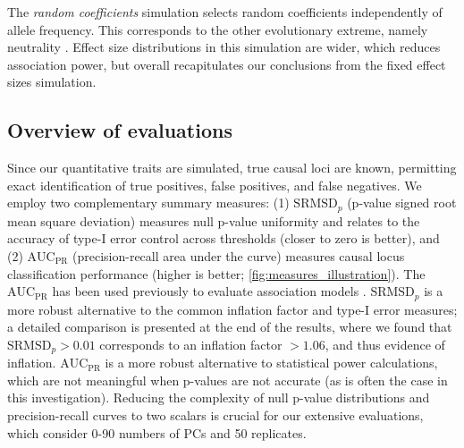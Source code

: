 \documentclass[11pt]{article}
\newcommand{\rmsd}{\text{SRMSD}_p}
\newcommand{\auc}{\text{AUC}_\text{PR}}
\begin{document}
The \textit{random coefficients} simulation selects random coefficients independently of allele frequency.
This corresponds to the other evolutionary extreme, namely neutrality \citep{simons_population_2018}.
Effect size distributions in this simulation are wider, which reduces association power, but overall recapitulates our conclusions from the fixed effect sizes simulation.

\subsection{Overview of evaluations}

Since our quantitative traits are simulated, true causal loci are known, permitting exact identification of true positives, false positives, and false negatives.
We employ two complementary summary measures:
(1) $\rmsd$ (p-value signed root mean square deviation) measures null p-value uniformity and relates to the accuracy of type-I error control across thresholds (closer to zero is better), and
(2) $\auc$ (precision-recall area under the curve) measures causal locus classification performance (higher is better; \cref{fig:measures_illustration}).
The $\auc$ has been used previously to evaluate association models \citep{rakitsch_lasso_2013}.
$\rmsd$ is a more robust alternative to the common inflation factor and type-I error measures; a detailed comparison is presented at the end of the results, where we found that $\rmsd > 0.01$ corresponds to an inflation factor $> 1.06$, and thus evidence of inflation.
$\auc$ is a more robust alternative to statistical power calculations, which are not meaningful when p-values are not accurate (as is often the case in this investigation).
Reducing the complexity of null p-value distributions and precision-recall curves to two scalars is crucial for our extensive evaluations, which consider 0-90 numbers of PCs and 50 replicates.
\end{document}
